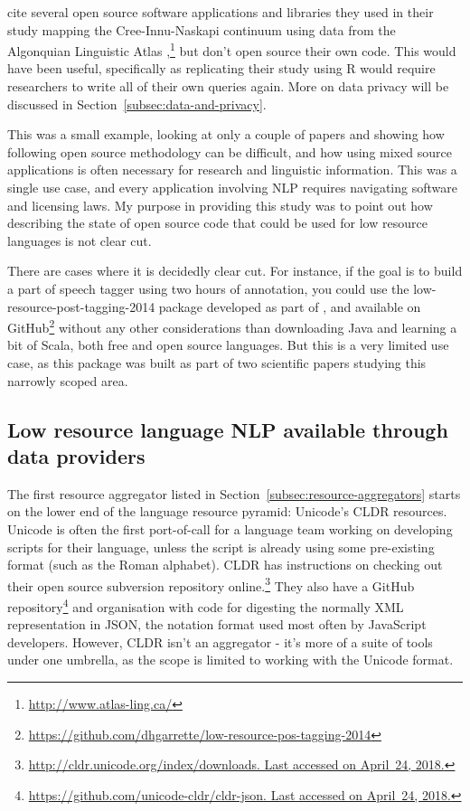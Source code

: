 \citet{cenerini2017mapping} cite several open source software applications and libraries they used in their study mapping the Cree-Innu-Naskapi continuum using data from the Algonquian Linguistic Atlas \citep{junker2011linguistic},\footnote{\href{http://www.atlas-ling.ca/}{http://www.atlas-ling.ca/}} but don't open source their own code. This would have been useful, specifically as replicating their study using R \citep{ihaka1996r} would require researchers to write all of their own queries again. More on data privacy will be discussed in Section~\ref{subsec:data-and-privacy}.

This was a small example, looking at only a couple of papers and showing how following open source methodology can be difficult, and how using mixed source applications is often necessary for research and linguistic information. This was a single use case, and every application involving NLP requires navigating software and licensing laws. My purpose in providing this study was to point out how describing the state of open source code that could be used for low resource languages is not clear cut. 

There are cases where it is decidedly clear cut. For instance, if the goal is to build a part of speech tagger using two hours of annotation, you could use the low-resource-post-tagging-2014 package developed as part of \citet{garrette2013real,garrette2013learning}, and available on GitHub\footnote{\href{https://github.com/dhgarrette/low-resource-pos-tagging-2014}{https://github.com/dhgarrette/low-resource-pos-tagging-2014}} without any other considerations than downloading Java and learning a bit of Scala, both free and open source languages. But this is a very limited use case, as this package was built as part of two scientific papers studying this narrowly scoped area.

\subsection{Low resource language NLP available through data providers}
\label{subsec:lrl-nlp-through-providers}

The first resource aggregator listed in Section~\ref{subsec:resource-aggregators} starts on the lower end of the language resource pyramid: Unicode's CLDR resources. Unicode is often the first port-of-call for a language team working on developing scripts for their language, unless the script is already using some pre-existing format (such as the Roman alphabet). CLDR has instructions on checking out their open source subversion repository online.\footnote{\href{http://cldr.unicode.org/index/downloads}{http://cldr.unicode.org/index/downloads. Last accessed on April~24, 2018.}} They also have a GitHub repository\footnote{\href{https://github.com/unicode-cldr/cldr-json}{https://github.com/unicode-cldr/cldr-json. Last accessed on April~24, 2018.}} and organisation with code for digesting the normally XML representation in JSON, the notation format used most often by JavaScript developers. However, CLDR isn't an aggregator - it's more of a suite of tools under one umbrella, as the scope is limited to working with the Unicode format.

